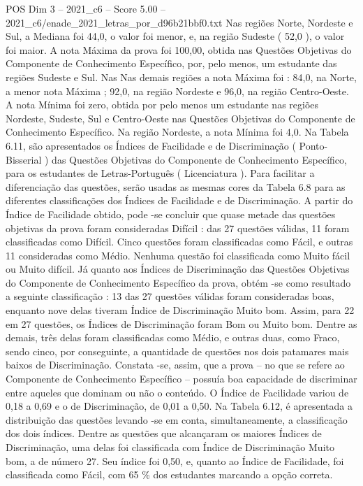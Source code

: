 \begin{textsample}{POS Dim 3 – 2021\_c6 – Score 5.00 – 2021\_c6/enade\_2021\_letras\_por\_d96b21bbf0.txt}
Nas regiões Norte, Nordeste e Sul, a Mediana foi 44,0, o valor foi menor, e, na região Sudeste ( 52,0 ), o valor foi maior.
A nota Máxima da prova foi 100,00, obtida nas Questões Objetivas do Componente de Conhecimento Específico, por, pelo menos, um estudante das regiões Sudeste e Sul.
Nas Nas demais regiões a nota Máxima foi : 84,0, na Norte, a menor nota Máxima ; 92,0, na região Nordeste e 96,0, na região Centro-Oeste.
A nota Mínima foi zero, obtida por pelo menos um estudante nas regiões Nordeste, Sudeste, Sul e Centro-Oeste nas Questões Objetivas do Componente de Conhecimento Específico.
Na região Nordeste, a nota Mínima foi 4,0.
Na Tabela 6.11, são apresentados os Índices de Facilidade e de Discriminação ( Ponto-Bisserial ) das Questões Objetivas do Componente de Conhecimento Específico, para os estudantes de Letras-Português ( Licenciatura ).
Para facilitar a diferenciação das questões, serão usadas as mesmas cores da Tabela 6.8 para as diferentes classificações dos Índices de Facilidade e de Discriminação.
A partir do Índice de Facilidade obtido, pode -se concluir que quase metade das questões objetivas da prova foram consideradas Difícil : das 27 questões válidas, 11 foram classificadas como Difícil.
Cinco questões foram classificadas como Fácil, e outras 11 consideradas como Médio.
Nenhuma questão foi classificada como Muito fácil ou Muito difícil.
Já quanto aos Índices de Discriminação das Questões Objetivas do Componente de Conhecimento Específico da prova, obtém -se como resultado a seguinte classificação : 13 das 27 questões válidas foram consideradas boas, enquanto nove delas tiveram Índice de Discriminação Muito bom.
Assim, para 22 em 27 questões, os Índices de Discriminação foram Bom ou Muito bom.
Dentre as demais, três delas foram classificadas como Médio, e outras duas, como Fraco, sendo cinco, por conseguinte, a quantidade de questões nos dois patamares mais baixos de Discriminação.
Constata -se, assim, que a prova – no que se refere ao Componente de Conhecimento Específico – possuía boa capacidade de discriminar entre aqueles que dominam ou não o conteúdo.
O Índice de Facilidade variou de 0,18 a 0,69 e o de Discriminação, de 0,01 a 0,50.
Na Tabela 6.12, é apresentada a distribuição das questões levando -se em conta, simultaneamente, a classificação dos dois índices.
Dentre as questões que alcançaram os maiores Índices de Discriminação, uma delas foi classificada com Índice de Discriminação Muito bom, a de número 27.
Seu índice foi 0,50, e, quanto ao Índice de Facilidade, foi classificada como Fácil, com 65 \% dos estudantes marcando a opção correta.

\end{textsample}
